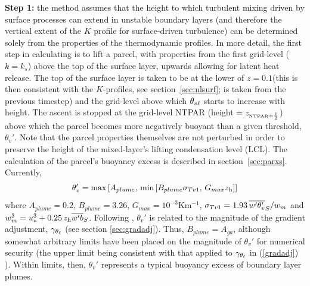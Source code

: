 \documentclass{UMDP_article}
\begin{document}
{\bf Step 1:} the method assumes that the height to which turbulent
mixing driven by surface processes can extend in unstable boundary
layers (and therefore the vertical extent of the $K$ profile for
surface-driven turbulence) can be determined solely from the
properties of the thermodynamic profiles.  In more detail, the first
step in calculating \zh is to lift a parcel, with properties from the
first grid-level ($k=k_s$) above the top of the surface layer, upwards
allowing for latent heat release.  The top of the surface layer is
taken to be at the lower of $z=0.1$\zh (this is then consistent with
the $K$-profiles, see section~\ref{sec:nlsurf}; \zh is taken from the
previous timestep) and the grid-level above which $\theta_{v\ell}$ starts to
increase with height.  The ascent is stopped at the grid-level NTPAR
(height \zhpar$=z_{\mbox{\tiny \rm NTPAR}+\frac{1}{2}}$) above which the parcel
becomes more negatively buoyant than a given threshold, $\theta_v'$.
Note that the parcel properties themselves are not perturbed in order
to preserve the height of the mixed-layer's lifting condensation level
(LCL).  The calculation of the parcel's buoyancy excess is described
in section~\ref{sec:parxs}.  Currently,
\begin{equation}
  \theta_v' = \mbox{max} \left[A_{plume}, 
           \, \mbox{min} \left[ B_{plume} \sigma_{Tv1}, 
           \, G_{max}z_{\rm h} \right] \right]
  \label{parcel_pert}
\end{equation}
where $A_{plume}=0.2$, $B_{plume}=3.26$, $G_{max}=10^{-3}$Km$^{-1}$,
$\sigma_{Tv1} = 1.93\, \overline{w'\theta_v'}_S/w_m$ and $w_m^3=u_*^3+0.25\,z_{\rm h} \overline{w'b}_S$.
Following \cite{holtslag93:_local_versus_nonloc_bound_layer},
$\theta_v'$ is related to the magnitude of the gradient adjustment,
$\gamma_{\theta_{\ell}}$ (see section \ref{sec:gradadj}).  Thus,
$B_{plume}=A_{ga}$, although somewhat arbitrary limits have been
placed on the magnitude of $\theta_v'$ for numerical security (the
upper limit being consistent with that applied to $\gamma_{\theta_{\ell}}$
in (\ref{gradadj}) ).  Within limits, then, $\theta_v'$ represents a
typical buoyancy excess of boundary layer plumes.
\end{document}
